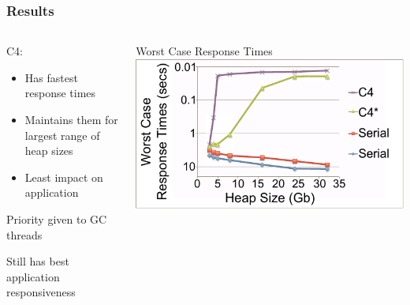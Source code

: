 \documentclass{beamer}
\newcommand{\linespace}{\vskip 0.25cm}
\begin{document}
\begin{frame}

\frametitle{Results}


\begin{columns}
\begin{column}{0.5\textwidth}

\color[RGB]{135,35,142}C4\color{black}:
\begin{itemize}
\item Has fastest response times
\item Maintains them for largest range of heap sizes
\item Least impact on application
\end{itemize}

\linespace
\linespace

Priority given to GC threads

\linespace
\linespace

Still has best application responsiveness

\end{column}

\begin{column}{0.5\textwidth}
\begin{center}
Worst Case Response Times
\includegraphics[width=.89\textwidth]{Illustrations/c4_results.pdf}
\end{center}
\end{column}
\end{columns}

\end{frame}
\end{document}
